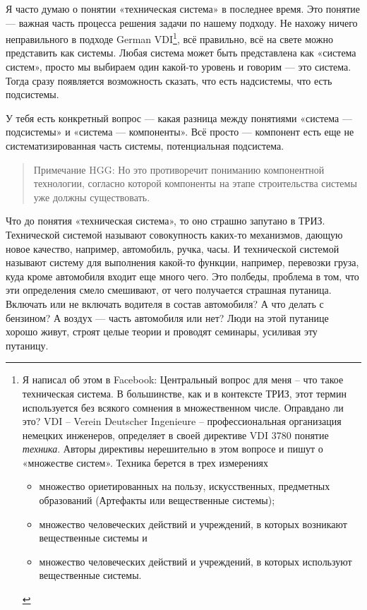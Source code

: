 \documentclass[11pt,a4paper]{article}
\begin{document}
Я часто думаю о понятии «техническая система» в последнее время. Это понятие —
важная часть процесса решения задачи по нашему подходу. Не нахожу ничего
неправильного в подходе German VDI\footnote{ Я написал об этом в Facebook:
  Центральный вопрос для меня -- что такое техническая система. В большинстве,
  как и в контексте ТРИЗ, этот термин используется без всякого сомнения в
  множественном числе. Оправдано ли это? VDI -- Verein Deutscher Ingenieure --
  профессиональная организация немецких инженеров, определяет в своей
  директиве VDI 3780 понятие \emph{техника}. Авторы директивы нерешительно в
  этом вопросе и пишут о «множестве систем». Техника берется в трех измерениях
  \begin{itemize}
  \item множество ориетированных на пользу, искусственных, предметных
    образований (Артефакты или вещественные системы);
  \item множество человеческих действий и учреждений, в которых возникают
    вещественные системы и
  \item множество человеческих действий и учреждений, в которых используют
    вещественные системы.
  \end{itemize}}, всё правильно, всё на свете можно представить как системы. Любая
система может быть представлена как «система систем», просто мы выбираем один
какой-то уровень и говорим — это система.  Тогда сразу появляется возможность
сказать, что есть надсистемы, что есть подсистемы.

У тебя есть конкретный вопрос — какая разница между понятиями «система —
подсистемы» и «система — компоненты». Всё просто — компонент есть еще не
систематизированная часть системы, потенциальная подсистема.

\begin{quote}
  Примечание HGG: Но это противоречит пониманию компонентной технологии,
  согласно которой компоненты на этапе строительства системы уже должны
  существовать.
\end{quote}

Что до понятия «техническая система», то оно страшно запутано в ТРИЗ.
Технической системой называют совокупность каких-то механизмов, дающую новое
качество, например, автомобиль, ручка, часы. И технической системой называют
систему для выполнения какой-то функции, например, перевозки груза, куда кроме
автомобиля входит еще много чего. Это полбеды, проблема в том, что эти
определения смело смешивают, от чего получается страшная путаница.  Включать
или не включать водителя в состав автомобиля? А что делать с бензином?  А
воздух — часть автомобиля или нет?  Люди на этой путанице хорошо живут, строят
целые теории и проводят семинары, усиливая эту путаницу.
 
\end{document}
